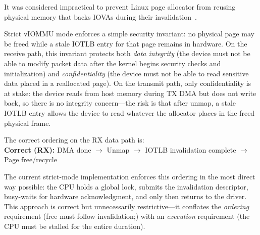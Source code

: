 
It was considered impractical to prevent Linux page allocator from reusing physical memory that backs IOVAs during their invalidation~\cite{Amit2011vIOMMU}.


Strict vIOMMU mode enforces a simple security invariant: no physical page may be freed while a stale IOTLB entry for that page remains in hardware. On the receive path, this invariant protects both \emph{data integrity} (the device must not be able to modify packet data after the kernel begins security checks and initialization) and \emph{confidentiality} (the device must not be able to read sensitive data placed in a reallocated page). On the transmit path, only confidentiality is at stake: the device reads from host memory during TX DMA but does not write back, so there is no integrity concern---the risk is that after unmap, a stale IOTLB entry allows the device to read whatever the allocator places in the freed physical frame.

The correct ordering on the RX data path is:\\

\textbf{Correct (RX):} DMA done $\rightarrow$ Unmap $\rightarrow$ IOTLB invalidation complete $\rightarrow$ Page free/recycle\\



The current strict-mode implementation enforces this ordering in the most direct way possible: the CPU holds a global lock, submits the invalidation descriptor, busy-waits for hardware acknowledgment, and only then returns to the driver. This approach is correct but unnecessarily restrictive---it conflates the \emph{ordering} requirement (free must follow invalidation;) with an \emph{execution} requirement (the CPU must be stalled for the entire duration).


